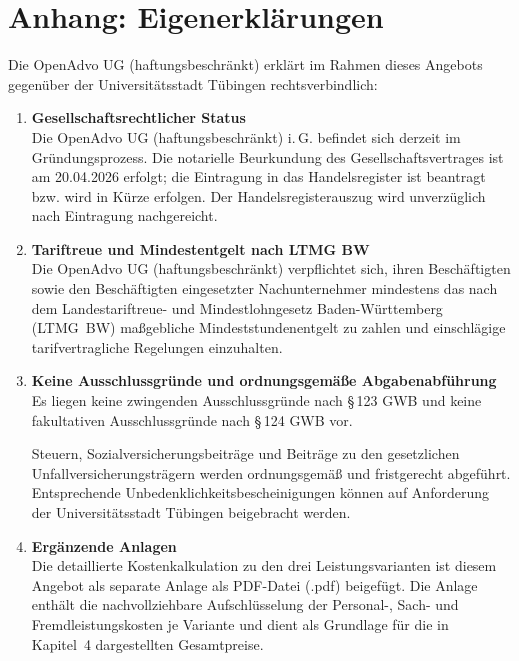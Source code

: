 \documentclass[11pt,a4paper,openany]{report}
\begin{document}
\chapter*{Anhang: Eigenerklärungen}

Die OpenAdvo UG (haftungsbeschränkt) erklärt im Rahmen dieses Angebots
gegenüber der Universitätsstadt Tübingen rechtsverbindlich:

\begin{enumerate}[label=\textbf{\arabic*.}, leftmargin=2em, itemsep=0.5em, parsep=2pt]

  \item \textbf{Gesellschaftsrechtlicher Status}\\
    Die OpenAdvo UG (haftungsbeschränkt) i.\,G. befindet sich derzeit im
    Gründungsprozess. Die notarielle Beurkundung des Gesellschaftsvertrages
    ist am 20.04.2026 erfolgt; die Eintragung in das Handelsregister ist
    beantragt bzw. wird in Kürze erfolgen. Der Handelsregisterauszug wird
    unverzüglich nach Eintragung nachgereicht.

  \item \textbf{Tariftreue und Mindestentgelt nach LTMG BW}\\
    Die OpenAdvo UG (haftungsbeschränkt) verpflichtet sich, ihren
    Beschäftigten sowie den Beschäftigten eingesetzter
    Nachunternehmer mindestens das nach dem Landestariftreue- und
    Mindestlohngesetz Baden-Württemberg (LTMG~BW) maßgebliche
    Mindeststundenentgelt zu zahlen und einschlägige tarifvertragliche
    Regelungen einzuhalten.

  \item \textbf{Keine Ausschlussgründe und ordnungsgemäße Abgabenabführung}\\
    Es liegen keine zwingenden Ausschlussgründe nach \S\,123 GWB und
    keine fakultativen Ausschlussgründe nach \S\,124 GWB vor.

    Steuern, Sozialversicherungsbeiträge und Beiträge zu den
    gesetzlichen Unfallversicherungsträgern werden ordnungsgemäß
    und fristgerecht abgeführt. Entsprechende
    Unbedenklichkeitsbescheinigungen können auf Anforderung der
    Universitätsstadt Tübingen beigebracht werden.

  \item \textbf{Ergänzende Anlagen}\\
    Die detaillierte Kostenkalkulation zu den drei Leistungsvarianten ist
    diesem Angebot als separate Anlage als PDF-Datei (.pdf) beigefügt.
    Die Anlage enthält die nachvollziehbare Aufschlüsselung der
    Personal-, Sach- und Fremdleistungskosten je Variante und dient als
    Grundlage für die in Kapitel~4 dargestellten Gesamtpreise.

\end{enumerate}
\end{document}

